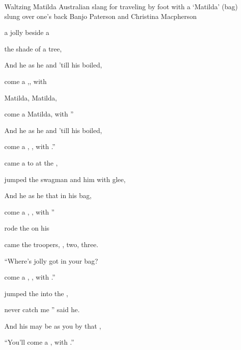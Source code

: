 \begin{SBSong}{Waltzing Matilda}
  {Australian slang for traveling by foot with a `Matilda' (bag) slung over one's back}
  {Banjo Paterson and Christina Macpherson}
  \begin{SBVerse}
     a jolly   beside a 

     the shade of a  tree, 

    And he  as he  and  'till his  boiled, 

     come a ,, with 
  \end{SBVerse}
  \begin{SBChorus}
     Matilda,  Matilda, 

     come a  Matilda, with '' 

    And he  as he  and  'till his  boiled, 

     come a , , with .'' 
  \end{SBChorus}
  \begin{SBVerse}
     came a  to  at the , 

     jumped the swagman and  him with glee, 

    And he  as he  that  in his  bag, 

     come a , , with ''
  \end{SBVerse} 
  \begin{SBVerse}
     rode the   on his  

     came the troopers, , two, three. 

    ``Where's  jolly   got in your  bag? 

     come a , , with .''
  \end{SBVerse} 
  \begin{SBVerse}
     jumped the   into the , 

     never catch me '' said he. 

    And his  may be  as you  by that , 

    ``{You'll} come a ,  with .'' 
  \end{SBVerse} 
\end{SBSong}